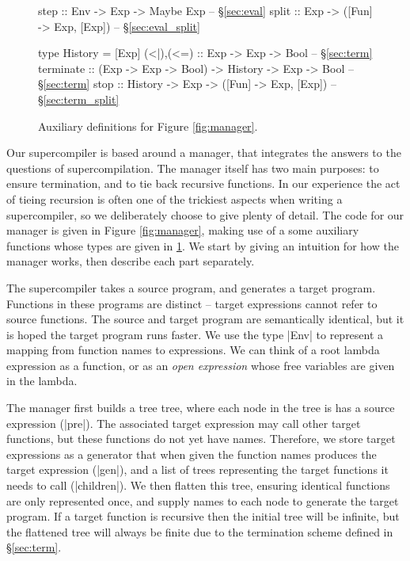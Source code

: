 \documentclass[draft]{sigplanconf}
\begin{document}
\begin{figure}
\begin{code}
step :: Env -> Exp -> Maybe Exp -- \S\ref{sec:eval}
split :: Exp -> ([Fun] -> Exp, [Exp]) -- \S\ref{sec:eval_split}

type History = [Exp]
(<|),(<=) :: Exp -> Exp -> Bool -- \S\ref{sec:term}
terminate  :: (Exp -> Exp -> Bool)
           -> History -> Exp -> Bool -- \S\ref{sec:term}
stop :: History -> Exp -> ([Fun] -> Exp, [Exp]) -- \S\ref{sec:term_split}
\end{code}
\caption{Auxiliary definitions for Figure \ref{fig:manager}.}
\label{fig:manager2}
\end{figure}

Our supercompiler is based around a manager, that integrates the answers to the questions of supercompilation. The manager itself has two main purposes: to ensure termination, and to tie back recursive functions. In our experience the act of tieing recursion is often one of the trickiest aspects when writing a supercompiler, so we deliberately choose to give plenty of detail. The code for our manager is given in Figure \ref{fig:manager}, making use of a some auxiliary functions whose types are given in \ref{fig:manager2}. We start by giving an intuition for how the manager works, then describe each part separately.

The supercompiler takes a source program, and generates a target program. Functions in these programs are distinct -- target expressions cannot refer to source functions. The source and target program are semantically identical, but it is hoped the target program runs faster. We use the type |Env| to represent a mapping from function names to expressions. We can think of a root lambda expression as a function, or as an \textit{open expression} whose free variables are given in the lambda.

The manager first builds a tree tree, where each node in the tree is has a source expression (|pre|). The associated target expression may call other target functions, but these functions do not yet have names. Therefore, we store target expressions as a generator that when given the function names produces the target expression (|gen|), and a list of trees representing the target functions it needs to call (|children|). We then flatten this tree, ensuring identical functions are only represented once, and supply names to each node to generate the target program. If a target function is recursive then the initial tree will be infinite, but the flattened tree will always be finite due to the termination scheme defined in \S\ref{sec:term}.
\end{document}
